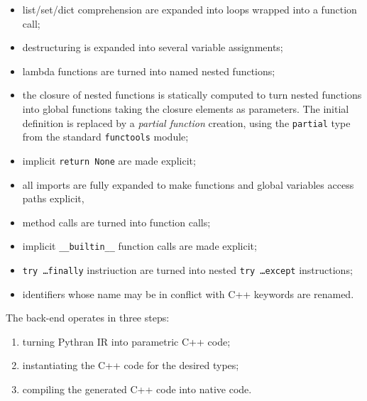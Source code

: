 \documentclass[10pt, onecolumn, preprint]{sigplanconf}
\begin{document}
\begin{itemize}
    \item list/set/dict comprehension are expanded into loops wrapped into a function call;

    \item destructuring is expanded into several variable assignments;

    \item lambda functions are turned into named nested functions;

    \item the closure of nested functions is statically computed to turn nested
        functions into global functions taking the closure elements as
        parameters. The initial definition is replaced by a \emph{partial
        function} creation, using the \texttt{partial} type from the standard \texttt{functools} module;

    \item implicit \texttt{return None} are made explicit;

    \item all imports are fully expanded to make functions and global variables access paths explicit,

    \item method calls are turned into function calls;

    \item implicit \texttt{\_\_builtin\_\_} function calls are made explicit;

    \item \texttt{try \dots finally} instriuction are turned into nested \texttt{try \dots except} instructions;

    \item identifiers whose name may be in conflict with C++ keywords are renamed.

\end{itemize}

The back-end operates in three steps:

\begin{enumerate}

    \item turning Pythran IR into parametric C++ code;

    \item instantiating the C++ code for the desired types;

    \item compiling the generated C++ code into native code.

\end{enumerate}
\end{document}
